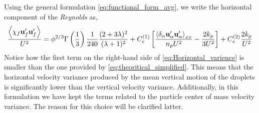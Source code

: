 Using the general formulation \ref{eq:functional_form_avg}, we write the horizontal component of the \textit{Reynolds} as, 
\begin{equation}
    \frac{\avg{\chi_f \textbf{u}_f'\textbf{u}_f'}}{U^2}
    = \phi^{2/3}\Gamma\left(\frac{1}{3}\right) \frac{1}{240}\frac{(2+3\lambda)^2 }{(\lambda+1)^2}
    + 
    C^{(1)}_e \left[
    \frac{\pavg{\textbf{u}_\alpha'\textbf{u}_\alpha'}_{xx}}{n_p U^2}
    - \frac{2k_p}{3U^2}  
    \right]
    + C^{(2)}_e
    \frac{2k_p}{U^2}  
    \label{eq:Horizontal_varience}
\end{equation}
Notice how the first term on the right-hand side of \ref{eq:Horizontal_varience} is smaller than the one provided by \ref{eq:theoritical_simplified}. 
This means that the horizontal velocity variance produced by the mean vertical motion of the droplets is significantly lower than the vertical velocity variance. 
Additionally, in this formulation we have kept the terms related to the particle center of mass velocity variance. 
The reason for this choice will be clarified latter. 


